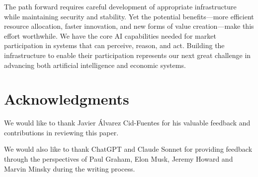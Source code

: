 \documentclass{article}
\begin{document}
The path forward requires careful development of appropriate infrastructure while maintaining security and stability. Yet the potential benefits—more efficient resource allocation, faster innovation, and new forms of value creation—make this effort worthwhile. We have the core AI capabilities needed for market participation in systems that can perceive, reason, and act. Building the infrastructure to enable their participation represents our next great challenge in advancing both artificial intelligence and economic systems.

\section*{Acknowledgments}

We would like to thank Javier Álvarez Cid-Fuentes for his valuable feedback and contributions in reviewing this paper.

We would also like to thank ChatGPT and Claude Sonnet for providing feedback through the perspectives of Paul Graham, Elon Musk, Jeremy Howard and Marvin Minsky during the writing process.



\end{document}
